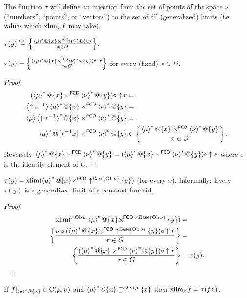 The function $\tau$ will define an injection from the set of points
of the space $\nu$ (``numbers'', ``points'', or ``vectors'')
to the set of all (generalized) limits (i.e. values which $\operatorname{xlim}_{x}f$
may take).
\begin{defn}
$\tau(y)\overset{\mathrm{def}}{=}\left\{ \frac{\left\langle \mu\right\rangle ^{\ast}@\{x\}\times^{\mathsf{FCD}}\left\langle \nu\right\rangle ^{\ast}@\{y\}}{x\in D}\right\}$.\end{defn}
\begin{prop}
$\tau(y)=\left\{ \frac{(\left\langle \mu\right\rangle ^{\ast}@\{x\}\times^{\mathsf{FCD}}\left\langle \nu\right\rangle ^{\ast}@\{y\})\circ\uparrow r}{r\in G}\right\}$
for every (fixed) $x\in D$.\end{prop}
\begin{proof}
~
\begin{align*}
(\left\langle \mu\right\rangle ^{\ast}@\{x\}\times^{\mathsf{FCD}}\left\langle \nu\right\rangle ^{\ast}@\{y\})\circ\uparrow r & =\\
\left\langle \uparrow r^{-1}\right\rangle\left\langle \mu\right\rangle ^{\ast}@\{x\}\times^{\mathsf{FCD}}\left\langle \nu\right\rangle ^{\ast}@\{y\} & =\\
\left\langle \mu\right\rangle\left\langle \uparrow r^{-1}\right\rangle ^{\ast}@\{x\}\times^{\mathsf{FCD}}\left\langle \nu\right\rangle ^{\ast}@\{y\} & =\\
\left\langle \mu\right\rangle ^{\ast}@\{r^{-1}x\}\times^{\mathsf{FCD}}\left\langle \nu\right\rangle ^{\ast}@\{y\} & \in \left\{ \frac{\left\langle \mu\right\rangle ^{\ast}@\{x\}\times^{\mathsf{FCD}}\left\langle \nu\right\rangle ^{\ast}@\{y\}}{x\in D}\right\}.
\end{align*}


Reversely $\left\langle \mu\right\rangle ^{\ast}@\{x\}\times^{\mathsf{FCD}}\left\langle \nu\right\rangle ^{\ast}@\{y\}=(\left\langle \mu\right\rangle ^{\ast}@\{x\}\times^{\mathsf{FCD}}\left\langle \nu\right\rangle ^{\ast}@\{y\})\circ\uparrow e$
where $e$ is the identify element of $G$.\end{proof}
\begin{prop}
$\tau(y)=\operatorname{xlim}(\left\langle \mu\right\rangle ^{\ast}@\{x\}\times^{\mathsf{FCD}}\uparrow^{\operatorname{Base}(\operatorname{Ob}\nu)}\{y\})$
(for every $x$). Informally: Every $\tau(y)$ is a generalized limit
of a constant funcoid.\end{prop}
\begin{proof}
~
\begin{align*}
\operatorname{xlim}(\uparrow^{\operatorname{Ob}\mu}\left\langle \mu\right\rangle ^{\ast}@\{x\}\times^{\mathsf{FCD}}\uparrow^{\operatorname{Base}(\operatorname{Ob}\nu)}\{y\}) & =\\
\left\{ \frac{\nu\circ(\left\langle \mu\right\rangle ^{\ast}@\{x\}\times^{\mathsf{FCD}}\uparrow^{\operatorname{Base}(\operatorname{Ob}\nu)}\{y\})\circ\uparrow r}{r\in G}\right\} & =\\
\left\{ \frac{(\left\langle \mu\right\rangle ^{\ast}@\{x\}\times^{\mathsf{FCD}}\left\langle \nu\right\rangle ^{\ast}@\{y\})\circ\uparrow r}{r\in G}\right\} & =\tau(y).
\end{align*}
\end{proof}
\begin{thm}
If $f|_{\left\langle \mu\right\rangle ^{\ast}@\{x\}}\in\mathrm{C}(\mu;\nu)$
and $\left\langle \mu\right\rangle ^{\ast}@\{x\}\sqsupseteq\uparrow^{\operatorname{Ob}\mu}\{x\}$
then $\operatorname{xlim}_{x}f=\tau(fx)$.\end{thm}
